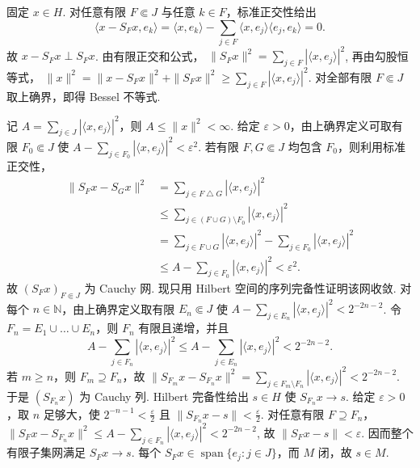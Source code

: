 \begin{FAProof}
固定 \(\displaystyle x\in H\). 对任意有限 \(\displaystyle F\Subset J\) 与任意 \(\displaystyle k\in F\)，标准正交性给出
\[
\langle x-S_Fx,e_k\rangle
=\langle x,e_k\rangle
-\sum_{j\in F}\langle x,e_j\rangle\langle e_j,e_k\rangle
=0.
\]
故 \(\displaystyle x-S_Fx\perp S_Fx\). 由有限正交和公式， \(\displaystyle \|S_Fx\|^2 =\sum_{j\in F}|\langle x,e_j\rangle|^2\),
再由勾股恒等式， \(\displaystyle \|x\|^2 =\|x-S_Fx\|^2+\|S_Fx\|^2 \geqslant\sum_{j\in F}|\langle x,e_j\rangle|^2\).
对全部有限 \(\displaystyle F\Subset J\) 取上确界，即得 Bessel 不等式.

记 \(\displaystyle A=\sum_{j\in J}|\langle x,e_j\rangle|^2\)，则 \(\displaystyle A\leqslant\|x\|^2<\infty\). 给定 \(\displaystyle \varepsilon>0\)，由上确界定义可取有限 \(\displaystyle F_0\Subset J\) 使 \(\displaystyle A-\sum_{j\in F_0}|\langle x,e_j\rangle|^2<\varepsilon^2\).
若有限 \(\displaystyle F,G\Subset J\) 均包含 \(\displaystyle F_0\)，则利用标准正交性，
\begin{align*}
\|S_Fx-S_Gx\|^2
&=\sum_{j\in F\mathbin{\triangle}G}|\langle x,e_j\rangle|^2\\
&\leqslant\sum_{j\in(F\cup G)\setminus F_0}|\langle x,e_j\rangle|^2\\
&=\sum_{j\in F\cup G}|\langle x,e_j\rangle|^2
-\sum_{j\in F_0}|\langle x,e_j\rangle|^2\\
&\leqslant A-\sum_{j\in F_0}|\langle x,e_j\rangle|^2
<\varepsilon^2.
\end{align*}
故 \(\displaystyle (S_Fx)_{F\Subset J}\) 为 Cauchy 网. 现只用 Hilbert 空间的序列完备性证明该网收敛. 对每个 \(\displaystyle n\in\mathbb N\)，由上确界定义取有限 \(\displaystyle E_n\Subset J\) 使 \(\displaystyle A-\sum_{j\in E_n}|\langle x,e_j\rangle|^2<2^{-2n-2}\).
令 \(\displaystyle F_n=E_1\cup\dots\cup E_n\)，则 \(\displaystyle F_n\) 有限且递增，并且
\[
A-\sum_{j\in F_n}|\langle x,e_j\rangle|^2
\leqslant A-\sum_{j\in E_n}|\langle x,e_j\rangle|^2
<2^{-2n-2}.
\]
若 \(\displaystyle m\geqslant n\)，则 \(\displaystyle F_m\supseteq F_n\)，故 \(\displaystyle \|S_{F_m}x-S_{F_n}x\|^2 =\sum_{j\in F_m\setminus F_n}|\langle x,e_j\rangle|^2 <2^{-2n-2}\).
于是 \(\displaystyle (S_{F_n}x)\) 为 Cauchy 列. Hilbert 完备性给出 \(\displaystyle s\in H\) 使 \(\displaystyle S_{F_n}x\to s\). 给定 \(\displaystyle \varepsilon>0\)，取 \(\displaystyle n\) 足够大，使 \(\displaystyle 2^{-n-1}<\frac{\varepsilon}{2}\) 且 \(\displaystyle \|S_{F_n}x-s\|<\frac{\varepsilon}{2}\). 对任意有限 \(\displaystyle F\supseteq F_n\)， \(\displaystyle \|S_Fx-S_{F_n}x\|^2 \leqslant A-\sum_{j\in F_n}|\langle x,e_j\rangle|^2 <2^{-2n-2}\),
故 \(\displaystyle \|S_Fx-s\|<\varepsilon\). 因而整个有限子集网满足 \(\displaystyle S_Fx\to s\). 每个 \(\displaystyle S_Fx\in\operatorname{span}\{e_j:j\in J\}\)，而 \(\displaystyle M\) 闭，故 \(\displaystyle s\in M\).


\end{FAProof}
